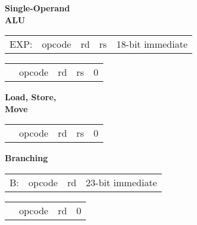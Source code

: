 \documentclass{article}
\begin{document}
\bigskip\bigskip

\begin{minipage}[t]{0.3\textwidth}
	\begin{center}
		\textbf{Single-Operand\\ ALU}
	\end{center}
\end{minipage}
\begin{minipage}[t]{110mm}	
	\begin{tabular}{p{12mm}|C{15mm}|C{10mm}|C{10mm}|C{55.3mm}|}
			EXP: & opcode & rd & rs & 18-bit immediate \\
	\end{tabular}

	\medskip

	\begin{tabular}{p{12mm}|C{15mm}|C{10mm}|C{10mm}|C{55.3mm}|}
		 & opcode & rd & rs & 0 \\
	\end{tabular}
\end{minipage}

\bigskip\bigskip\bigskip

\begin{minipage}[t]{0.3\textwidth}
	\begin{center}
		\textbf{Load, Store, \\ Move}
	\end{center}
\end{minipage}
\begin{minipage}[t]{110mm}

	\begin{tabular}{p{12mm}|C{15mm}|C{10mm}|C{10mm}|C{55.15mm}|}
		 & opcode & rd & rs & 0 \\
	\end{tabular}

	\end{minipage}

\bigskip\bigskip\bigskip

\begin{minipage}[t]{0.3\textwidth}
	\begin{center}
		\textbf{Branching}
	\end{center}
\end{minipage}
\begin{minipage}[t]{110mm}
	\begin{tabular}{p{12mm}|C{15mm}|C{10mm}|C{65.3mm}|}
		\quad B: & opcode & rd & 23-bit immediate \\
	\end{tabular}

	\medskip

	\begin{tabular}{p{12mm}|C{15mm}|C{10mm}|C{65.3mm}|}
		 & opcode & rd & 0 \\
	\end{tabular}

\end{minipage}
\end{document}
